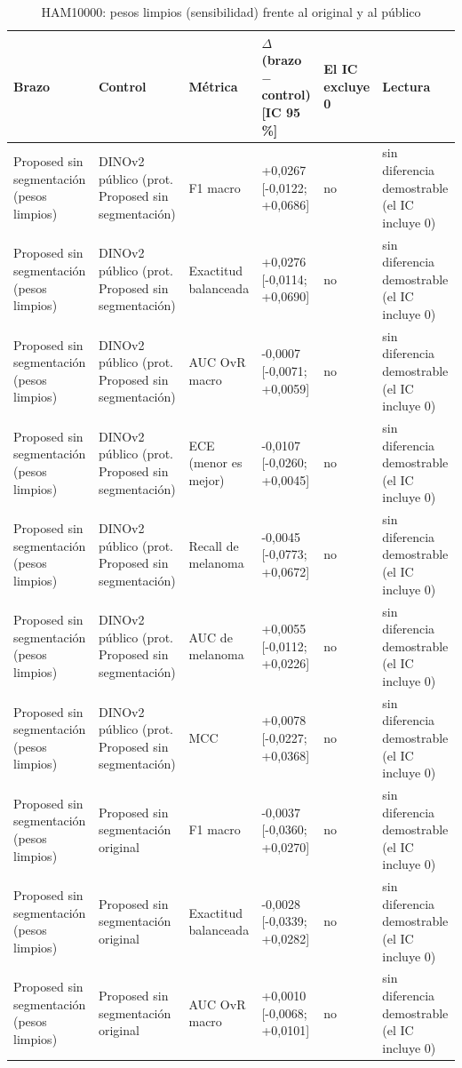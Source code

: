 \begingroup\scriptsize
\begin{longtable}{@{}llllll@{}}
\caption{HAM10000: pesos limpios (sensibilidad) frente al original y al público}\label{tab:contrast-ham-clean} \\
\toprule
Brazo & Control & Métrica & $\Delta$ (brazo $-$ control) [IC 95 \%] & El IC excluye 0 & Lectura \\
\midrule
Proposed sin segmentación (pesos limpios) & DINOv2 público (prot. Proposed sin segmentación) & F1 macro & +0,0267 [-0,0122; +0,0686] & no & sin diferencia demostrable (el IC incluye 0) \\
Proposed sin segmentación (pesos limpios) & DINOv2 público (prot. Proposed sin segmentación) & Exactitud balanceada & +0,0276 [-0,0114; +0,0690] & no & sin diferencia demostrable (el IC incluye 0) \\
Proposed sin segmentación (pesos limpios) & DINOv2 público (prot. Proposed sin segmentación) & AUC OvR macro & -0,0007 [-0,0071; +0,0059] & no & sin diferencia demostrable (el IC incluye 0) \\
Proposed sin segmentación (pesos limpios) & DINOv2 público (prot. Proposed sin segmentación) & ECE (menor es mejor) & -0,0107 [-0,0260; +0,0045] & no & sin diferencia demostrable (el IC incluye 0) \\
Proposed sin segmentación (pesos limpios) & DINOv2 público (prot. Proposed sin segmentación) & Recall de melanoma & -0,0045 [-0,0773; +0,0672] & no & sin diferencia demostrable (el IC incluye 0) \\
Proposed sin segmentación (pesos limpios) & DINOv2 público (prot. Proposed sin segmentación) & AUC de melanoma & +0,0055 [-0,0112; +0,0226] & no & sin diferencia demostrable (el IC incluye 0) \\
Proposed sin segmentación (pesos limpios) & DINOv2 público (prot. Proposed sin segmentación) & MCC & +0,0078 [-0,0227; +0,0368] & no & sin diferencia demostrable (el IC incluye 0) \\
Proposed sin segmentación (pesos limpios) & Proposed sin segmentación original & F1 macro & -0,0037 [-0,0360; +0,0270] & no & sin diferencia demostrable (el IC incluye 0) \\
Proposed sin segmentación (pesos limpios) & Proposed sin segmentación original & Exactitud balanceada & -0,0028 [-0,0339; +0,0282] & no & sin diferencia demostrable (el IC incluye 0) \\
Proposed sin segmentación (pesos limpios) & Proposed sin segmentación original & AUC OvR macro & +0,0010 [-0,0068; +0,0101] & no & sin diferencia demostrable (el IC incluye 0) \\

\end{longtable}

